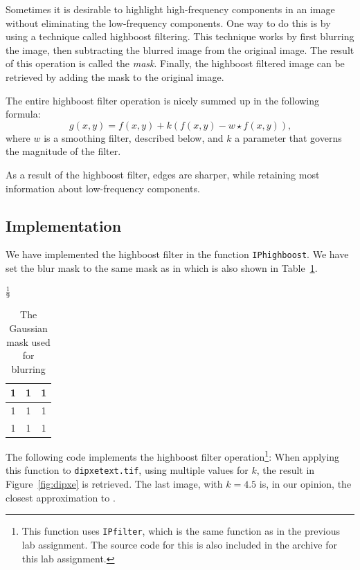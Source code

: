\setcounter{subsection}{0}

Sometimes it is desirable to highlight high-frequency components in an image without eliminating the low-frequency components.
One way to do this is by using a technique called highboost filtering.
This technique works by first blurring the image, then subtracting the blurred image from the original image.
The result of this operation is called the \emph{mask}.
Finally, the highboost filtered image can be retrieved by adding the mask to the original image.

The entire highboost filter operation is nicely summed up in the following formula:
\[ g(x, y) = f(x, y) +  k(f(x, y) - w \star f(x, y)) \text{,} \]
where \(w\) is a smoothing filter, described below, and \(k\) a parameter that governs the magnitude of the filter.

As a result of the highboost filter, edges are sharper, while retaining most information about low-frequency components. 
\subsection{Implementation}
We have implemented the highboost filter in the function \texttt{IPhighboost}.
We have set the blur mask to the same mask as in \cite[Figure 3.32(a)]{gonzalez2002digital} which is also shown in Table~\ref{tbl:mask}.
\begin{table}[!htb]
  \begin{center}
    $\frac{1}{9}$
    \begin{tabular}{|c|c|c|}\hline
      1 & 1 & 1 \\ \hline
      1 & 1 & 1 \\ \hline
      1 & 1 & 1 \\ \hline
    \end{tabular}
    \caption{The Gaussian mask used for blurring}
    \label{tbl:mask}
  \end{center}
\end{table}

The following code implements the highboost filter operation\footnote{This function uses \texttt{IPfilter}, which is the same function as in the previous lab assignment. The source code for this is also included in the archive for this lab assignment.}:
When applying this function to \texttt{dipxetext.tif}, using multiple values for \(k\), the result in Figure~\ref{fig:dipxe} is retrieved.
The last image, with \(k=4.5\) is, in our opinion, the closest approximation to \cite[Figure 3.40(e)]{gonzalez2002digital}.

